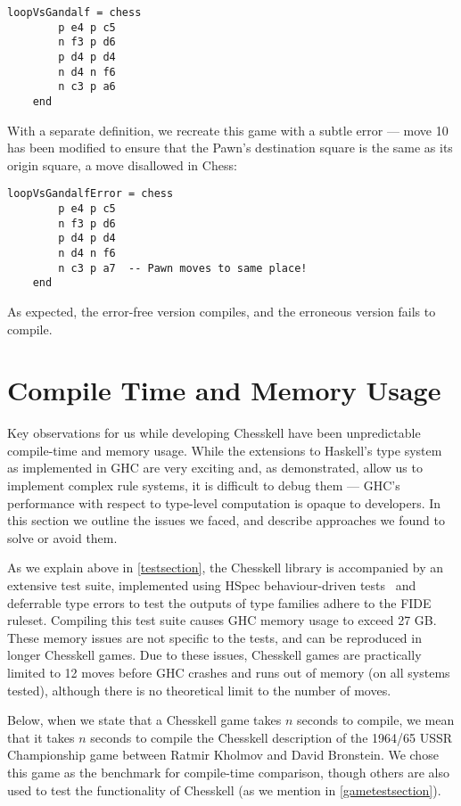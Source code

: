 \begin{lstlisting}
loopVsGandalf = chess
        p e4 p c5
        n f3 p d6
        p d4 p d4
        n d4 n f6
        n c3 p a6
    end
\end{lstlisting}

With a separate definition, we recreate this game with a subtle error --- move 10 has been modified to ensure that the Pawn's destination square is the same as its origin square, a move disallowed in Chess:

\begin{lstlisting}
loopVsGandalfError = chess
        p e4 p c5
        n f3 p d6
        p d4 p d4
        n d4 n f6
        n c3 p a7  -- Pawn moves to same place!
    end
\end{lstlisting}

As expected, the error-free version compiles, and the erroneous version fails to compile.

\section{Compile Time and Memory Usage} \label{problemsection}

Key observations for us while developing Chesskell have been unpredictable compile-time and memory usage. While the extensions to Haskell's type system as implemented in GHC are very exciting and, as demonstrated, allow us to implement complex rule systems, it is difficult to debug them --- GHC's performance with respect to type-level computation is opaque to developers. In this section we outline the issues we faced, and describe approaches we found to solve or avoid them.

As we explain above in \cref{testsection}, the Chesskell library is accompanied by an extensive test suite, implemented using HSpec behaviour-driven tests~\cite{hspec} and deferrable type errors to test the outputs of type families adhere to the FIDE ruleset. Compiling this test suite causes GHC memory usage to exceed 27 GB. These memory issues are not specific to the tests, and can be reproduced in longer Chesskell games. Due to these issues, Chesskell games are practically limited to 12 moves before GHC crashes and runs out of memory (on all systems tested), although there is no theoretical limit to the number of moves.

Below, when we state that a Chesskell game takes $n$ seconds to compile, we mean that it takes $n$ seconds to compile the Chesskell description of the 1964/65 USSR Championship game between Ratmir Kholmov and David Bronstein. We chose this game as the benchmark for compile-time comparison, though others are also used to test the functionality of Chesskell (as we mention in \cref{gametestsection}).

